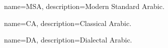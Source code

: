 \makeglossaries
 
{
    name=MSA,
    description={Modern Standard Arabic. }
}

{
    name=CA,
    description={Classical Arabic. }
}

{
    name=DA,
    description={Dialectal Arabic. }
}
